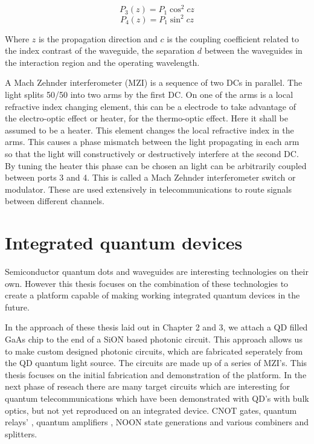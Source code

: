\begin{equation} P_3(z) = P_1 \cos^2 cz \end{equation} \begin{equation} P_4(z) =
P_1 \sin^2 cz \end{equation}

Where $z$ is the propagation direction and $c$ is the coupling coefficient
related to the index contrast of the waveguide, the separation $d$ between the
waveguides in the interaction region and the operating wavelength.

A Mach Zehnder interferometer (MZI) is a sequence of two DCs in parallel. The
light splits 50/50 into two arms by the first DC. On one of the arms is a local
refractive index changing element, this can be a electrode to take advantage of
the electro-optic effect or heater, for the thermo-optic effect. Here it shall
be assumed to be a heater. This element changes the local refractive index in
the arms. This causes a phase mismatch between the light propagating in each arm
so that the light will constructively or destructively interfere at the second
DC. By tuning the heater this phase can be chosen an light can be arbitrarily
coupled between ports 3 and 4. This is called a Mach Zehnder interferometer
switch or modulator. These are used extensively in telecommunications to route
signals between different channels.

 \section{Integrated quantum devices}

Semiconductor quantum dots and waveguides are interesting technologies on their
own. However this thesis focuses on the combination of these technologies to
create a platform capable of making working integrated quantum devices in the
future.

In the approach of these thesis laid out in Chapter 2 and 3, we attach a QD
filled GaAs chip to the end of a SiON based photonic circuit. This approach
allows us to make custom designed photonic circuits, which are fabricated
seperately from the QD quantum light source. The circuits are made up of a
series of MZI's. This thesis focuses on the initial fabrication and
demonstration of the platform. In the next phase of reseach there are many
target circuits which are interesting for quantum telecommunications which have
been demonstrated with QD's with bulk optics, but not yet reproduced on an
integrated device. CNOT gates\cite{cnotpooley}, quantum relays'
\cite{varnava2015entangled}, quantum amplifiers \cite{kocsis2013heralded,
zavatta2011high}, NOON state generations \cite{bennett2015cavity} and various
combiners and splitters.

